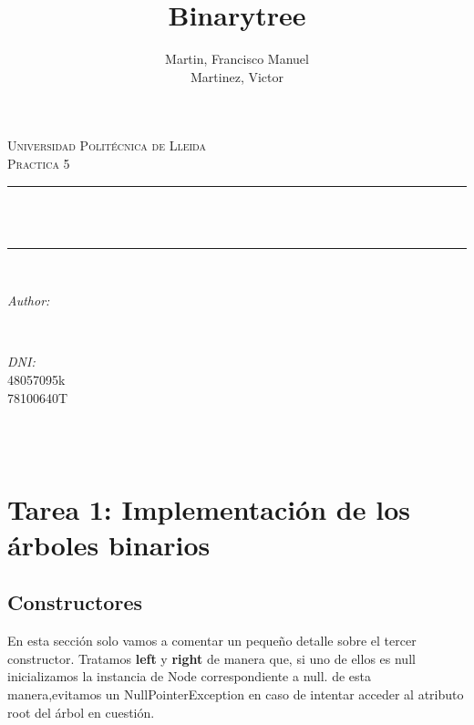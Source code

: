 \documentclass{article}
\title{Binarytree}
\author{Martin, Francisco Manuel \\
        Martinez, Victor
}
\makeatletter
\let\thetitle\@title
\let\theauthor\@author
\let\thedate\@date
\makeatother
\begin{document}
    \begin{titlepage}
	\centering
    \vspace*{0.5 cm}

    \textsc{\LARGE Universidad Politécnica de Lleida}\\[2.0 cm]	%
	\textsc{\large Practica 5}\\[0.5 cm]				%
	\rule{\linewidth}{0.2 mm} \\[0.4 cm]
	{ \huge \bfseries \thetitle}\\
	\rule{\linewidth}{0.2 mm} \\[1.5 cm]

	\begin{minipage}{0.4\textwidth}
		\begin{flushleft} \large
			\emph{Author:}\\
			\theauthor
			\end{flushleft}
			\end{minipage}~
			\begin{minipage}{0.4\textwidth}
			\begin{flushright} \large
			\emph{DNI:} \\
			48057095k \\
			78100640T%
		\end{flushright}
	\end{minipage}\\[2 cm]

	{\large \thedate}\\[2 cm]

	\vfill

\end{titlepage}
\tableofcontents
\pagebreak


\section{Tarea 1: Implementación de los árboles binarios}
    \subsection{Constructores}
    En esta sección solo vamos a comentar un pequeño detalle sobre el tercer constructor. \newline
    Tratamos \textbf{left} y \textbf{right} de manera que, si uno de ellos es null inicializamos la instancia de Node correspondiente a null. \newline
    de esta manera,evitamos un NullPointerException en caso de intentar acceder al atributo root del árbol en cuestión.
\end{document}
